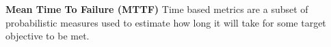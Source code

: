 \textbf{Mean Time To Failure (MTTF)} 
Time based metrics are a subset of probabilistic measures used to estimate how long it will take for some target objective to be met\cite{Dacier_Deswarte_Kaaniche}\cite{Ortalo_1999}\cite{McQueen_Boyer_Flynn_Beitel_2005}. 







